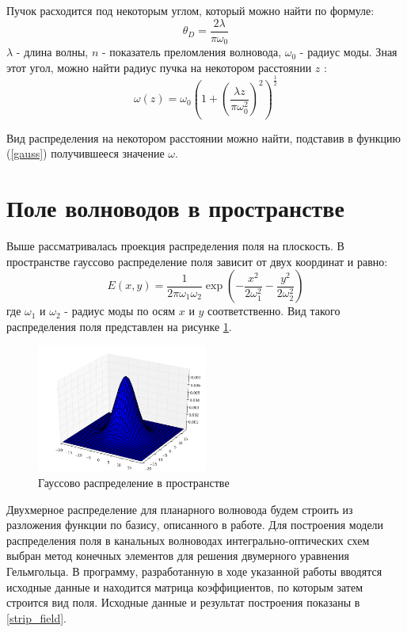 Пучок расходится под некоторым углом, который можно найти по формуле\cite{okamoto}:
\begin{equation}
	\theta_D = \frac{2\lambda}{\pi \omega_0}
	\label{divergence}
\end{equation}
$\lambda$ - длина волны, $n$ - показатель преломления волновода, $\omega_0$ - радиус моды.
Зная этот угол, можно найти радиус пучка на некотором расстоянии $z$ \cite{lefevre}:
\begin{equation}
	\omega(z) = \omega_0 \left( 1 + \left(\frac{\lambda z}{\pi \omega_0^2}\right)^2 \right)^\frac{1}{2}
\end{equation}

Вид распределения на некотором расстоянии можно найти, подставив в функцию (\ref{gauss}) получившееся значение $\omega$.

\section{Поле волноводов в пространстве}

Выше рассматривалась проекция распределения поля на плоскость. В пространстве гауссово распределение поля зависит от двух координат и равно:
\begin{equation}
  \label{gauss3d}
  E(x,y)=\frac{1}{2\pi\omega_1\omega_2}\exp\left(-\frac{x^2}{2\omega_1^2}-\frac{y^2}{2\omega_2^2}\right)
\end{equation}
где $\omega_1$ и $\omega_2$ - радиус моды по осям $x$ и $y$ соответственно. Вид такого распределения поля представлен на рисунке \ref{gauss3dPlot}.
\begin{figure}[h!]
	\includegraphics[width=0.5\textwidth]{img/gauss3d.png}
	\caption{Гауссово распределение в пространстве}
	\label{gauss3dPlot}
\end{figure}

Двухмерное распределение для планарного волновода будем строить из разложения функции по базису, описанного в работе\cite{vlada}. Для построения модели распределения поля в канальных волноводах интегрально-оптических схем выбран метод конечных элементов для решения двумерного уравнения Гельмгольца. В программу, разработанную в ходе указанной работы вводятся исходные данные и находится матрица коэффициентов, по которым затем строится вид поля. Исходные данные и результат построения показаны в \ref{strip_field}.

